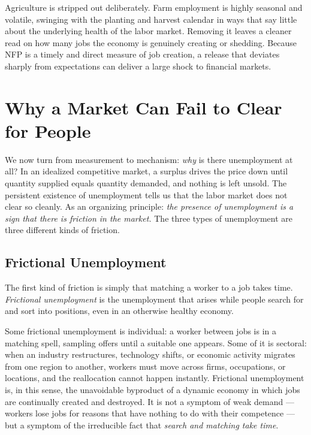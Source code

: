 Agriculture is stripped out deliberately. Farm employment is highly seasonal and volatile, swinging with the planting and harvest calendar in ways that say little about the underlying health of the labor market. Removing it leaves a cleaner read on how many jobs the economy is genuinely creating or shedding. Because NFP is a timely and direct measure of job creation, a release that deviates sharply from expectations can deliver a large shock to financial markets.

\section{Why a Market Can Fail to Clear for People}

We now turn from measurement to mechanism: \emph{why} is there unemployment at all? In an idealized competitive market, a surplus drives the price down until quantity supplied equals quantity demanded, and nothing is left unsold. The persistent existence of unemployment tells us that the labor market does not clear so cleanly. As an organizing principle: \emph{the presence of unemployment is a sign that there is friction in the market.} The three types of unemployment are three different kinds of friction.

\subsection{Frictional Unemployment}

The first kind of friction is simply that matching a worker to a job takes time. \emph{Frictional unemployment} is the unemployment that arises while people search for and sort into positions, even in an otherwise healthy economy.


Some frictional unemployment is individual: a worker between jobs is in a matching spell, sampling offers until a suitable one appears. Some of it is sectoral: when an industry restructures, technology shifts, or economic activity migrates from one region to another, workers must move across firms, occupations, or locations, and the reallocation cannot happen instantly. Frictional unemployment is, in this sense, the unavoidable byproduct of a dynamic economy in which jobs are continually created and destroyed. It is not a symptom of weak demand --- workers lose jobs for reasons that have nothing to do with their competence --- but a symptom of the irreducible fact that \emph{search and matching take time}.

